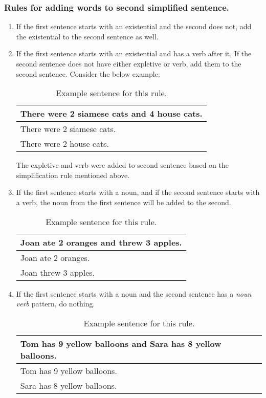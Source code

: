 \documentclass[11pt]{article}
\begin{document}
\subsubsection{Rules for adding words to second simplified sentence.}
\begin{enumerate}
 \item 
If the first sentence starts with an existential and the second does not, add the existential to the second sentence as well.

\item 
If the first sentence starts with an existential and has a verb after it, If the second sentence does not have either expletive or verb, add them to the second sentence. Consider the below example:

\begin{table}[h!]
\centering
\begin{tabular}{ | m{25em} | }
\hline
 \textbf{There were 2 siamese cats and 4 house cats.}\\
\hline
There were 2 siamese cats.\\
\hline
There were 2 house cats.\\
\hline
\end{tabular}
\caption{Example sentence for this rule.}
\label{table:9}
\end{table}

The expletive and verb were added to second sentence based on the simplification rule mentioned above.

\item
If the first sentence starts with a noun, and if the second sentence starts with a verb, the noun from the first sentence will be added to the second.

\begin{table}[h!]
\centering
\begin{tabular}{ | m{25em} | }
\hline
 \textbf{Joan ate 2 oranges and threw 3 apples.}\\
\hline
Joan ate 2 oranges.\\
\hline
Joan threw 3 apples.\\
\hline
\end{tabular}
\caption{Example sentence for this rule.}
\label{table:10}
\end{table}

\item 
If the first sentence starts with a noun and the second sentence has a \textit{noun verb} pattern, do nothing.

\begin{table}[h!]
\centering
\begin{tabular}{ | m{25em} | }
\hline
 \textbf{Tom has 9 yellow balloons and Sara has 8 yellow balloons.}\\
\hline
Tom has 9 yellow balloons.\\
\hline
Sara has 8 yellow balloons.\\
\hline
\end{tabular}
\caption{Example sentence for this rule.}
\label{table:11}
\end{table}


\end{enumerate}
\end{document}
